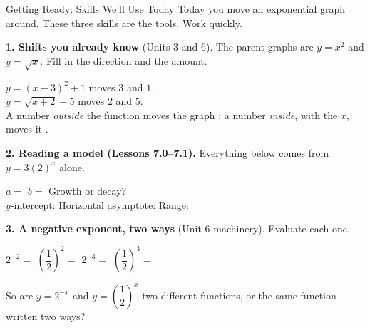 \documentclass[10pt]{article}
\begin{document}
\namedateperiod

\vspace{0.10in}

\begin{notesbox}{Getting Ready: Skills We'll Use Today}
\small Today you move an exponential graph around. These three skills are the tools. Work quickly.

\vspace{4pt}
\textbf{1. Shifts you already know} (Units 3 and 6). The parent graphs are $y=x^{2}$ and
$y=\sqrt{x}$. Fill in the direction and the amount.

\vspace{3pt}
\hspace*{1.2em} $y=(x-3)^{2}+1$ \; moves  $3$ \; and  $1$. \\[3pt]
\hspace*{1.2em} $y=\sqrt{x+2}-5$ \; moves  $2$ \; and  $5$. \\[3pt]
\hspace*{1.2em} A number \emph{outside} the function moves the graph ; a number
\emph{inside}, with the $x$, moves it .

\vspace{6pt}
\textbf{2. Reading a model (Lessons 7.0--7.1).} Everything below comes from $y=3(2)^{x}$ alone.

\vspace{3pt}
\hspace*{1.2em} $a=$  \quad $b=$  \quad Growth or decay?
 \\[4pt]
\hspace*{1.2em} $y$-intercept:  \quad Horizontal asymptote:  \quad
Range: 

\vspace{6pt}
\textbf{3. A negative exponent, two ways} (Unit 6 machinery). Evaluate each one.

\vspace{3pt}
\hspace*{1.2em} $2^{-2}=$  \qquad $\left(\dfrac{1}{2}\right)^{2}=$ 
\qquad $2^{-3}=$  \qquad $\left(\dfrac{1}{2}\right)^{3}=$ 

\vspace{4pt}
\hspace*{1.2em} So are $y=2^{-x}$ and $y=\left(\dfrac{1}{2}\right)^{x}$ two different functions, or
the same function written two ways? 

\end{notesbox}
\end{document}
